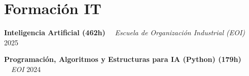 \documentclass[letterpaper,11pt]{article}
\begin{document}
\section{Formación IT}
    \noindent
    \begin{minipage}[t]{1.0\linewidth}
        {\textbf{Inteligencia Artificial (462h)}} 
        \ \textendash \ 
        {\color{detailgray}\textit{Escuela de Organización Industrial (EOI)}}
        \hfill 
        {\small 2025}
    \end{minipage}
    \par 
    \vspace{0.1cm} %
    \noindent
    \begin{minipage}[t]{1.0\linewidth}
        {\textbf{Programación, Algoritmos y Estructuras para IA (Python) (179h)}} 
        \ \textendash \ 
        {\color{detailgray}\textit{EOI}}
        \hfill 
        {\small 2024}
    \end{minipage}
    \par 
    \vspace{0.1cm} %

\end{document}
